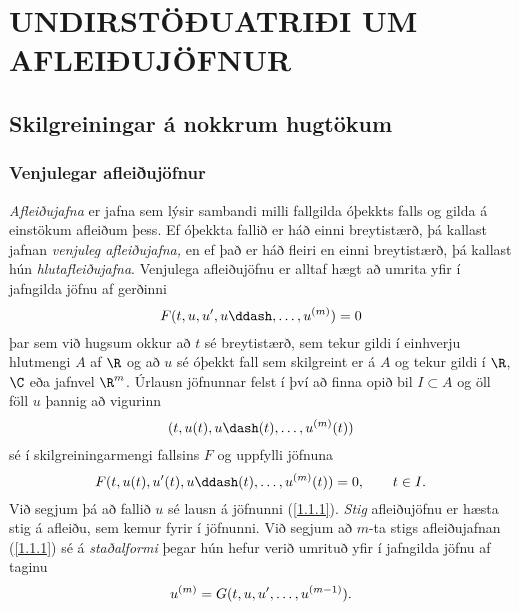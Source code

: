 \chapter
{UNDIRSTÖÐUATRIÐI UM AFLEIÐUJÖFNUR}




\section{Skilgreiningar á nokkrum hugtökum}

\subsection*{Venjulegar afleiðujöfnur}

{\it Afleiðujafna} er  jafna sem lýsir
sambandi milli fallgilda óþekkts falls og gilda á einstökum 
afleiðum þess.  Ef óþekkta fallið er háð einni breytistærð, 
þá kallast jafnan {\it venjuleg afleiðujafna,
} 
en ef það er háð fleiri en einni breytistærð, þá
kallast hún {\it hlutafleiðujafna}.  
Venjulega afleiðujöfnu er alltaf hægt að umrita yfir í jafngilda jöfnu
af gerðinni
\begin{equation*}
F(t,u,u',u\ddash,\dots,u\sp{(m)})=0 \label{1.1.1}
\end{equation*}
þar sem við hugsum okkur að $t$ sé breytistærð, sem tekur gildi í
einhverju hlutmengi $A$ af $\R$ og að $u$ sé óþekkt fall sem skilgreint er
á $A$ og tekur gildi í $\R$, $\C$ eða jafnvel $\R^m$.  
Úrlausn jöfnunnar felst í því að finna opið bil $I\subset A$ og
öll föll $u$ þannig að vigurinn
 \begin{equation*}(t,u(t),u\dash(t),\dots,u\sp{(m)}(t))\label{1.1.2}
 \end{equation*}
sé í skilgreiningarmengi fallsins $F$ og uppfylli jöfnuna
 \begin{equation*}F(t,u(t),u'(t),u\ddash(t),\dots,u\sp{(m)}(t))=0,
 \qquad t\in I.\label{1.1.3}
 \end{equation*}
Við  segjum  þá að fallið $u$ sé lausn á jöfnunni (\ref{1.1.1}).
{\it Stig}
afleiðujöfnu er hæsta stig á afleiðu, sem
kemur fyrir í jöfnunni.  
Við segjum að $m$-ta stigs afleiðujafnan (\ref{1.1.1}) sé á 
{\it staðalformi}
þegar hún hefur verið umrituð yfir í jafngilda jöfnu af taginu
 \begin{equation*}u\sp{(m)}=G(t,u,u',\dots,u\sp{(m-1)}).\label{1.1.4}
 \end{equation*}

